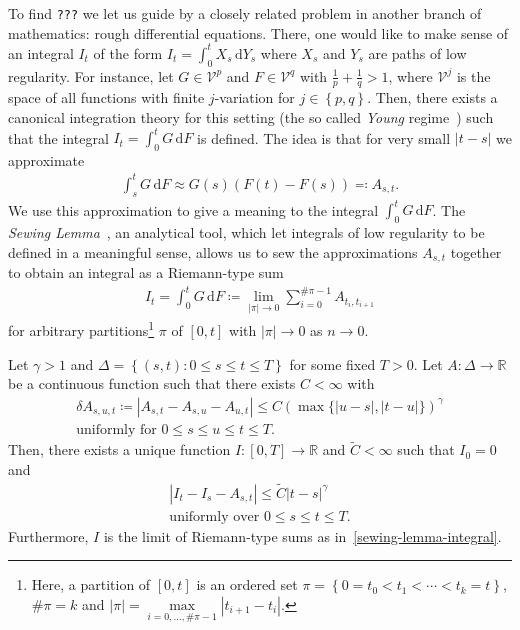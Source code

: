 To find \texttt{???} we let us guide by a closely related problem in another branch of mathematics: rough differential equations. There, one would like to make sense of an integral \(I_t\)  of the form \(I_t = \int^t_0 X_s \, \mathrm{d}Y_s\) where \(X_s\) and \(Y_s\) are paths of low regularity. For instance, let \(G \in \mathcal{V}^p\) and \(F \in \mathcal{V}^q\) with \(\frac{1}{p} + \frac{1}{q} > 1\), where \(\mathcal{V}^j\) is the space of all functions with finite \(j\)-variation for \( j \in \left \{ p,q \right \} \). Then, there exists a canonical integration theory for this setting (the so called \emph{Young} regime~\cite{Young1936AnIO}) such that the integral \(I_t = \int^t_0 G \, \mathrm{d}F\) is defined. The idea is that for very small \(|t-s|\) we approximate 
\begin{align*}
    \int^t_s G \, \mathrm{d}F \approx G(s)(F(t) - F(s)) \eqqcolon A_{s,t}.
\end{align*}
We use this approximation to give a meaning to the integral \(\int^t_0 G \, \mathrm{d}F\).
The \emph{Sewing Lemma}~\cite{GUBINELLI200486}, an analytical tool, which let integrals of low regularity to be defined in a meaningful sense, allows us to sew the approximations \(A_{s,t}\) together to obtain an integral as a Riemann-type sum
\begin{align}\label{sewing-lemma-integral}
    I_t = \int^t_0 G \, \mathrm{d}F \coloneqq \lim\limits_{|\pi| \to 0} \sum\limits_{i=0}^{\# \pi - 1} A_{t_i,t_{i+1}}
\end{align}
for arbitrary partitions\footnote{Here, a partition of \([0,t]\) is an ordered set \(\pi = \left \{ 0 = t_0 < t_1 < \cdots < t_k = t  \right \} \), \( \# \pi = k \) and \(|\pi| = \max\limits_{i=0, \ldots ,\# \pi - 1} |t_{i+1} - t_{i}|\).} \( \pi \) of \([0,t]\) with \(|\pi| \to 0\) as \(n \to 0\).
\begin{lemma}\label{first-sewing-lemma}
    Let \(\gamma > 1\) and \( \Delta = \left \{ (s,t) :  0 \leq s \leq t \leq T\right \} \) for some fixed \(T > 0\). Let \(A: \Delta \to \mathbb{R}\) be a continuous function such that there exists \( C <\infty \) with
    \begin{gather}
        \delta A_{s,u,t} \coloneqq |A_{s,t} - A_{s,u} - A_{u,t}| \leq C {(\max \{|u-s|,|t-u|\})}^\gamma \label{sewing-lemma-condition}\\
        \text{uniformly for \(0 \leq s \leq u \leq t \leq T\)}. \nonumber
    \end{gather} 
    Then, there exists a unique function \(I: [0,T] \to \mathbb{R}\) and \(\tilde C < {\infty}\)  such that \(I_0 = 0\) and 
    \begin{gather*}
        |I_t - I_s - A_{s,t}| \leq \tilde C|t-s|^\gamma \\
        \text{uniformly over \(0 \leq s \leq t \leq T\).}
    \end{gather*}  
    Furthermore, \(I\) is the limit of Riemann-type sums as in~\eqref{sewing-lemma-integral}.  
\end{lemma}
